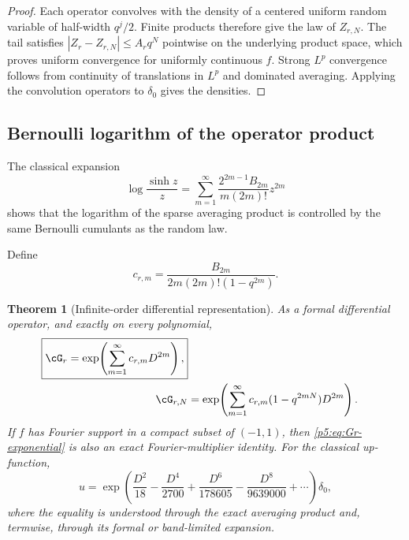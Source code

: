 \documentclass[11pt]{article}
\newtheorem{theorem}{Theorem}[section]
\theoremstyle{definition}
\theoremstyle{remark}
\begin{document}
\begin{proof}
Each operator convolves with the density of a centered uniform random variable
of half-width $q^j/2$.  Finite products therefore give the law of $Z_{r,N}$.
The tail satisfies $|Z_r-Z_{r,N}|\le A_rq^N$ pointwise on the underlying
product space, which proves uniform convergence for uniformly continuous $f$.
Strong $L^p$ convergence follows from continuity of translations in $L^p$ and
dominated averaging.  Applying the convolution operators to $\delta_0$ gives
the densities.
\end{proof}

\subsection{Bernoulli logarithm of the operator product}

The classical expansion
\begin{equation}
 \log\frac{\sinh z}{z}
 =\sum_{m=1}^{\infty}
   \frac{2^{2m-1}B_{2m}}{m(2m)!}z^{2m}                   \label{p5:eq:log-sinh}
\end{equation}
shows that the logarithm of the sparse averaging product is controlled by the
same Bernoulli cumulants as the random law.

Define
\begin{equation}
 c_{r,m}=\frac{B_{2m}}{2m(2m)!(1-q^{2m})}.                 \label{p5:eq:crm}
\end{equation}

\begin{theorem}[Infinite-order differential representation]
\label{p5:thm:infinite-differential-operator}
As a formal differential operator, and exactly on every polynomial,
\begin{align}
 \boxed{\displaystyle
 \cG_r
 =\exp\!\left(\sum_{m=1}^{\infty}c_{r,m}D^{2m}\right),}  \label{p5:eq:Gr-exponential}\\
 \cG_{r,N}
 &=\exp\!\left(\sum_{m=1}^{\infty}
       c_{r,m}(1-q^{2mN})D^{2m}\right).                   \label{p5:eq:GrN-exponential}
\end{align}
If $f$ has Fourier support in a compact subset of $(-1,1)$, then
\eqref{p5:eq:Gr-exponential} is also an exact Fourier-multiplier identity.
For the classical up-function,
\begin{equation}
 \boxed{\displaystyle
 u=\exp\!\left(
   \frac{D^2}{18}-\frac{D^4}{2700}+\frac{D^6}{178605}
   -\frac{D^8}{9639000}+\cdots\right)\delta_0,}           \label{p5:eq:u-differential-exponential}
\end{equation}
where the equality is understood through the exact averaging product and,
termwise, through its formal or band-limited expansion.
\end{theorem}
\end{document}
